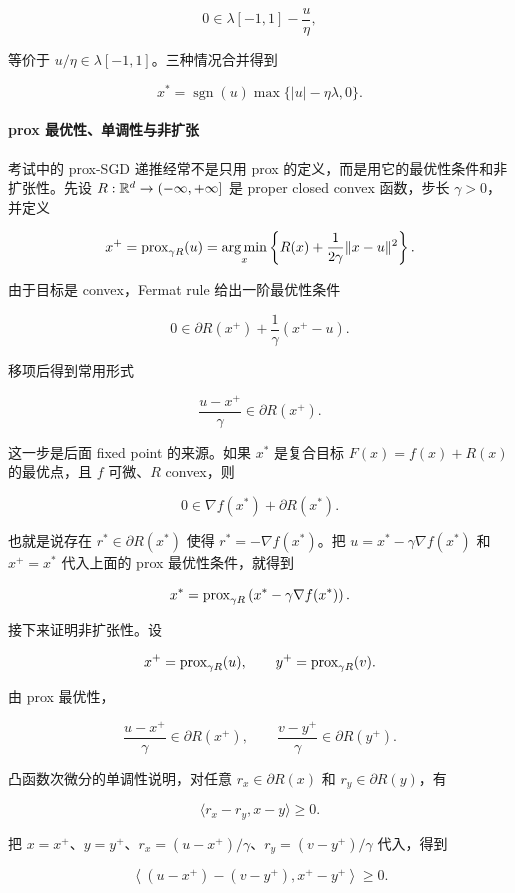 \documentclass[11pt]{ctexart}
\begin{document}
\[
  0\in
  \lambda[-1,1]
  -
  \frac{u}{\eta},
\]

等价于 \(u/\eta\in\lambda[-1,1]\)。三种情况合并得到

\[
  x^*
  =
  \operatorname{sgn}(u)\max\{|u|-\eta\lambda,0\}.
\]

\paragraph{prox 最优性、单调性与非扩张}


考试中的 prox-SGD 递推经常不是只用 prox 的定义，而是用它的最优性条件和非扩张性。先设 \(R:\mathbb{R}^d\to(-\infty,+\infty]\) 是 proper closed convex 函数，步长 \(\gamma>0\)，并定义

\[
  x^+
  =
  \operatorname{prox}_{\gamma R}(u)
  =
  \operatorname*{arg\,min}_x
  \left\{
    R(x)+\frac{1}{2\gamma}\|x-u\|^2
  \right\}.
\]

由于目标是 convex，Fermat rule 给出一阶最优性条件

\[
  0
  \in
  \partial R(x^+)
  +
  \frac1\gamma(x^+-u).
\]

移项后得到常用形式

\[
  \frac{u-x^+}{\gamma}
  \in
  \partial R(x^+).
\]

这一步是后面 fixed point 的来源。如果 \(x^*\) 是复合目标 \(F(x)=f(x)+R(x)\) 的最优点，且 \(f\) 可微、\(R\) convex，则

\[
  0\in\nabla f(x^*)+\partial R(x^*).
\]

也就是说存在 \(r^*\in\partial R(x^*)\) 使得 \(r^*=-\nabla f(x^*)\)。把 \(u=x^*-\gamma\nabla f(x^*)\) 和 \(x^+=x^*\) 代入上面的 prox 最优性条件，就得到

\[
  x^*
  =
  \operatorname{prox}_{\gamma R}
  \left(x^*-\gamma\nabla f(x^*)\right).
\]

接下来证明非扩张性。设

\[
  x^+=\operatorname{prox}_{\gamma R}(u),
  \qquad
  y^+=\operatorname{prox}_{\gamma R}(v).
\]

由 prox 最优性，

\[
  \frac{u-x^+}{\gamma}\in\partial R(x^+),
  \qquad
  \frac{v-y^+}{\gamma}\in\partial R(y^+).
\]

凸函数次微分的单调性说明，对任意 \(r_x\in\partial R(x)\) 和 \(r_y\in\partial R(y)\)，有

\[
  \langle r_x-r_y,x-y\rangle\ge0.
\]

把 \(x=x^+\)、\(y=y^+\)、\(r_x=(u-x^+)/\gamma\)、\(r_y=(v-y^+)/\gamma\) 代入，得到

\[
  \left\langle
    (u-x^+)-(v-y^+),
    x^+-y^+
  \right\rangle
  \ge0.
\]
\end{document}
